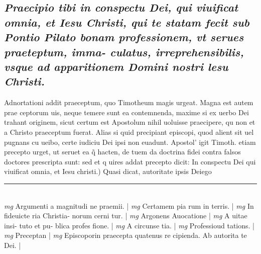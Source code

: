 \documentclass{article}
\begin{document}
\begin{pages}
\subsection*{\textit{Praecipio tibi in conspectu Dei, qui viuificat omnia, et Iesu Christi, qui te statam fecit sub Pontio Pilato bonam professionem, vt serues praeteptum, imma- culatus, irreprehensibilis, vsque ad apparitionem Domini nostri lesu Christi. }}\pstart Adnortationi addit praeceptum, quo Timotheum magis urgeat. Magna est autem prae ceptorum uis, neque temere sunt ea contemnenda, maxime si ex uerbo Dei trahant originem, sicut certum est Apostolum nihil uoluisse praecipere, qu non et a Christo praeceptum fuerat. Alias si quid precipiant episcopi, quod alient sit uel pugnans cu ueibo, certe iudiciu Dei ipsi non euadunt. Apostol' igit Timoth. etiam precepto urget, ut seruet ea q̃ hacten, de tuem da doctrina fidei contra falsos doctores prescripta sunt: sed et q uires addat precepto dicit: In conspectu Dei qui viuificat omnia, et Iesu christi.) Quasi dicat, autoritate ipsis Deiego  \pend
\vspace{0.5cm}\noindent
\vspace{0.2cm}\rule{1cm}{0.2pt}\\ 
\hspace{0.2cm}\textit{mg}
\footnotesize Argumenti a magnitudi ne praemii. 
\normalsize| 
\hspace{0.2cm}\textit{mg}
\footnotesize Certamem pia rum in terris. 
\normalsize| 
\hspace{0.2cm}\textit{mg}
\footnotesize In fideuicte ria Christia- norum cerni tur. 
\normalsize| 
\hspace{0.2cm}\textit{mg}
\footnotesize Argonens Auocatione 
\normalsize| 
\hspace{0.2cm}\textit{mg}
\footnotesize A uitae insi- tuto et pu- blica profes fione. 
\normalsize| 
\hspace{0.2cm}\textit{mg}
\footnotesize A circunse tia. 
\normalsize| 
\hspace{0.2cm}\textit{mg}
\footnotesize Professioud tations. 
\normalsize| 
\hspace{0.2cm}\textit{mg}
\footnotesize Preceptan 
\normalsize| 
\hspace{0.2cm}\textit{mg}
\footnotesize Episcoporin praecepta quatenus re cipienda. Ab autorita te Dei. 
\normalsize| 

\end{pages}
\end{document}
